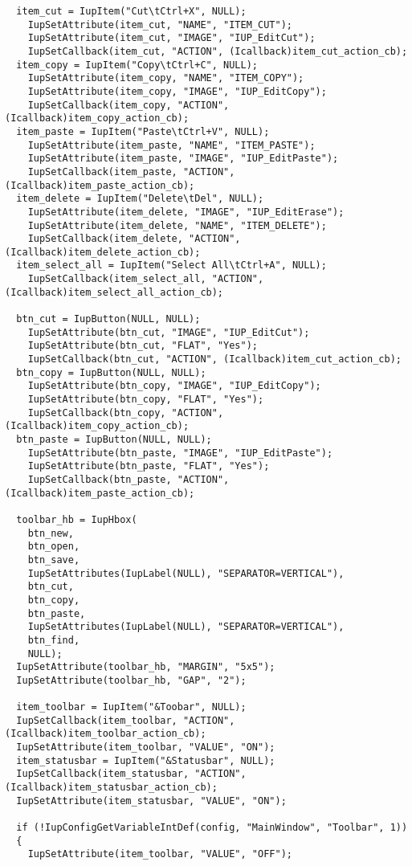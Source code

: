 \documentclass{ctexart}
\begin{document}
\begin{lstlisting}
  item_cut = IupItem("Cut\tCtrl+X", NULL);
    IupSetAttribute(item_cut, "NAME", "ITEM_CUT");
    IupSetAttribute(item_cut, "IMAGE", "IUP_EditCut");
    IupSetCallback(item_cut, "ACTION", (Icallback)item_cut_action_cb);
  item_copy = IupItem("Copy\tCtrl+C", NULL);
    IupSetAttribute(item_copy, "NAME", "ITEM_COPY");  
    IupSetAttribute(item_copy, "IMAGE", "IUP_EditCopy");
    IupSetCallback(item_copy, "ACTION", (Icallback)item_copy_action_cb);
  item_paste = IupItem("Paste\tCtrl+V", NULL);
    IupSetAttribute(item_paste, "NAME", "ITEM_PASTE");
    IupSetAttribute(item_paste, "IMAGE", "IUP_EditPaste");
    IupSetCallback(item_paste, "ACTION", (Icallback)item_paste_action_cb);
  item_delete = IupItem("Delete\tDel", NULL);
    IupSetAttribute(item_delete, "IMAGE", "IUP_EditErase");  
    IupSetAttribute(item_delete, "NAME", "ITEM_DELETE");
    IupSetCallback(item_delete, "ACTION", (Icallback)item_delete_action_cb);
  item_select_all = IupItem("Select All\tCtrl+A", NULL);
    IupSetCallback(item_select_all, "ACTION", (Icallback)item_select_all_action_cb);

  btn_cut = IupButton(NULL, NULL);
    IupSetAttribute(btn_cut, "IMAGE", "IUP_EditCut");
    IupSetAttribute(btn_cut, "FLAT", "Yes");
    IupSetCallback(btn_cut, "ACTION", (Icallback)item_cut_action_cb);
  btn_copy = IupButton(NULL, NULL);
    IupSetAttribute(btn_copy, "IMAGE", "IUP_EditCopy");
    IupSetAttribute(btn_copy, "FLAT", "Yes");
    IupSetCallback(btn_copy, "ACTION", (Icallback)item_copy_action_cb);
  btn_paste = IupButton(NULL, NULL);
    IupSetAttribute(btn_paste, "IMAGE", "IUP_EditPaste");
    IupSetAttribute(btn_paste, "FLAT", "Yes");
    IupSetCallback(btn_paste, "ACTION", (Icallback)item_paste_action_cb);

  toolbar_hb = IupHbox(
    btn_new,
    btn_open,
    btn_save,
    IupSetAttributes(IupLabel(NULL), "SEPARATOR=VERTICAL"),
    btn_cut,
    btn_copy,
    btn_paste,
    IupSetAttributes(IupLabel(NULL), "SEPARATOR=VERTICAL"),
    btn_find,
    NULL);
  IupSetAttribute(toolbar_hb, "MARGIN", "5x5");
  IupSetAttribute(toolbar_hb, "GAP", "2");

  item_toolbar = IupItem("&Toobar", NULL);
  IupSetCallback(item_toolbar, "ACTION", (Icallback)item_toolbar_action_cb);
  IupSetAttribute(item_toolbar, "VALUE", "ON");
  item_statusbar = IupItem("&Statusbar", NULL);
  IupSetCallback(item_statusbar, "ACTION", (Icallback)item_statusbar_action_cb);
  IupSetAttribute(item_statusbar, "VALUE", "ON");

  if (!IupConfigGetVariableIntDef(config, "MainWindow", "Toolbar", 1))
  {
    IupSetAttribute(item_toolbar, "VALUE", "OFF");


\end{lstlisting}
\end{document}
